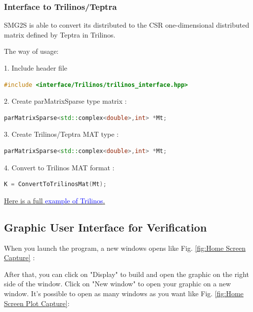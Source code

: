 \subsubsection{Interface to Trilinos/Teptra}

SMG2S is able to convert its distributed to the CSR one-dimensional distributed matrix defined by Teptra in Trilinos.

The way of usage:

1. Include header file

\begin{lstlisting}[language=C++,frame=single]
#include <interface/Trilinos/trilinos_interface.hpp>
\end{lstlisting}

2. Create parMatrixSparse type matrix :
\begin{lstlisting}[language=C++,frame=single]
parMatrixSparse<std::complex<double>,int> *Mt;
\end{lstlisting}

3. Create Trilinos/Teptra MAT type :
\begin{lstlisting}[language=C++,frame=single]
parMatrixSparse<std::complex<double>,int> *Mt;
\end{lstlisting}

4. Convert to Trilinos MAT format :
\begin{lstlisting}[language=C++,frame=single]
K = ConvertToTrilinosMat(Mt); 
\end{lstlisting}

\href{https://github.com/SMG2S/SMG2S/tree/master/example/teptra}{Here is a full \textcolor{blue}{ example of Trilinos}.}

\subsection{Graphic User Interface for Verification}

When you launch the program, a new windows opens like Fig. \ref{fig:Home Screen Capture} :

After that, you can click on "Display" to build and open the graphic on the right side of the window. Click on "New window" to open your graphic on a new window. It's possible to open as many windows as you want like Fig. \ref{fig:Home Screen Plot Capture}:

